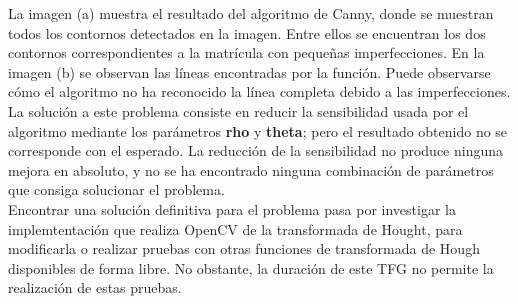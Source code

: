 La imagen (a) muestra el resultado del algoritmo de Canny, donde se muestran todos los contornos detectados en la imagen. Entre ellos se encuentran los dos contornos correspondientes a la matrícula con pequeñas imperfecciones. En la imagen (b) se observan las líneas encontradas por la función. Puede observarse cómo el algoritmo no ha reconocido la línea completa debido a las imperfecciones.\\

La solución a este problema consiste en reducir la sensibilidad usada por el algoritmo mediante los parámetros \textbf{rho} y \textbf{theta}; pero el resultado obtenido no se corresponde con el esperado. La reducción de la sensibilidad no produce ninguna mejora en absoluto, y no se ha encontrado ninguna combinación de parámetros que consiga solucionar el problema.\\

Encontrar una solución definitiva para el problema pasa por investigar la implemtentación que realiza OpenCV de la transformada de Hought, para modificarla o realizar pruebas con otras funciones de transformada de Hough disponibles de forma libre. No obstante, la duración de este \ac{TFG} no permite la realización de estas pruebas.